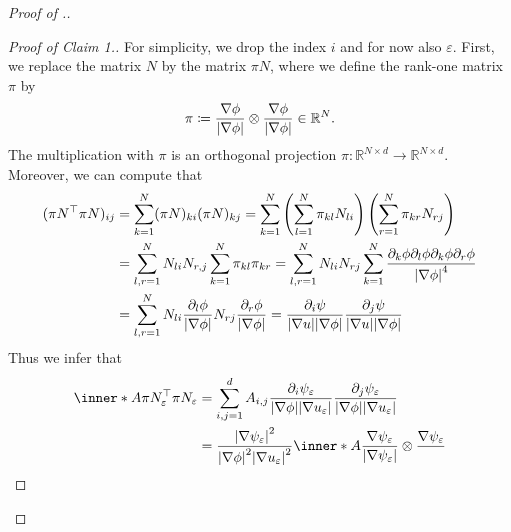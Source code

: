 \begin{proof}[Proof of .]
	\begin{proof}[Proof of Claim 1.]
		For simplicity, we drop the index $ i $ and for now also $ \varepsilon 
		$.
		First, we replace the matrix $ N $ by the matrix $ \pi N $, where we 
		define the rank-one matrix $ \pi $ by
		\begin{equation*}
			\pi 
			\coloneqq
			\frac{ \nabla \phi }{ \abs{ \nabla \phi } }
			\otimes
			\frac{ \nabla \phi }{ \abs{ \nabla \phi } }
			\in 
			\mathbb{ R }^{ N }.
		\end{equation*}
		The multiplication with $ \pi $ is an orthogonal projection $ \pi 
		\colon \mathbb{ R }^{ N \times d } \to \mathbb{ R }^{ N \times d } $. 
		Moreover, we can compute that
		\begin{align*}
			( \pi N^{ \top } \pi N )_{ i j }
			& =
			\sum_{ k = 1 }^{ N }
				( \pi N )_{ k i }
				( \pi N )_{ k j }
			=
			\sum_{ k = 1 }^{ N }
				\left(
					\sum_{ l = 1 }^{ N }
						\pi_{ k l } N_{ l i }
				\right)
				\left(
					\sum_{ r = 1 }^{ N }
						\pi_{ k r } N_{ r j }
				\right)
			\\
			& =
			\sum_{ l, r = 1 }^{ N }
				N_{ l i } N_{ r , j }
				\sum_{ k = 1 }^{ N }
					\pi_{ k l }
					\pi_{ k r }
			=
			\sum_{ l, r = 1 }^{ N }
				N_{ l i }N_{ r j }
				\sum_{ k = 1 }^{ N }
					\frac{ \partial_{ k } \phi  \partial_{ l } \phi \partial_{ 
					k } \phi \partial_{ r } \phi }{ \abs{ \nabla \phi 
					}^{ 4 } }
			\\
			& =
			\sum_{ l, r = 1 }^{ N }
				N_{ l i } \frac{ \partial_{ l } \phi }{ \abs{ \nabla
				\phi } }
				N_{ r j } \frac{ \partial_{ r } \phi }{ \abs{ \nabla 
				\phi } }
			=
			\frac{ \partial_{ i } \psi }{ \abs{ \nabla u } \abs{ \nabla
			\phi } }
			\frac{ \partial_{ j } \psi }{ \abs{ \nabla u } \abs{ \nabla 
			\phi } }
		\end{align*}
		Thus we infer that
		\begin{align*}
			\inner*{ A }{ \pi N_{ \varepsilon }^{ \top } \pi N_{ \varepsilon } }
			& =
			\sum_{ i, j = 1 }^{ d }
				A_{ i , j } 
				\frac{ \partial_{ i } \psi_{ \varepsilon } }{ \abs{ \nabla \phi 
				} \abs{ \nabla u_{ \varepsilon } } }
				\frac{ \partial_{ j } \psi_{ \varepsilon } }{ \abs{ \nabla \phi 
				} \abs{ \nabla u_{ \varepsilon } } }
			\\
			& =
			\frac{ \abs{ \nabla \psi_{ \varepsilon } }^{ 2 } }{ \abs{ \nabla 
			\phi }^{ 2 } \abs{ \nabla u_{ \varepsilon } }^{ 2 } }
			\inner*{ A }
			{ \frac{ \nabla \psi_{ \varepsilon } }{ \abs{ \nabla \psi_{ 
			\varepsilon } } } \otimes \frac{ \nabla \psi_{ \varepsilon } }{ 
}}
\end{align*}
\end{proof}
\end{proof}
